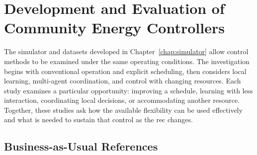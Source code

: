 \chapter{Development and Evaluation of Community Energy Controllers}
\label{chap:control-benchmark}
\let\chapterfivesectionmark\sectionmark
\renewcommand{\sectionmark}[1]{\markright{Control Methods: Illustrative Draft}}

\newcommand{\illustrativereading}{\par\noindent\textcolor{orange!70!black}{\textbf{Illustrative reading.}}\ }
\newcommand{\illustrativecaption}{\textbf{Illustrative values; invented.}\ }

The simulator and datasets developed in Chapter~\ref{chap:simulator} allow control methods to be examined under the same operating conditions. The investigation begins with conventional operation and explicit scheduling, then considers local learning, multi-agent coordination, and control with changing resources. Each study examines a particular opportunity: improving a schedule, learning with less interaction, coordinating local decisions, or accommodating another resource. Together, these studies ask how the available flexibility can be used effectively and what is needed to sustain that control as the \gls{rec} changes.

\begin{center}
\end{center}

\section{Business-as-Usual References}
\label{sec:control-progression}

